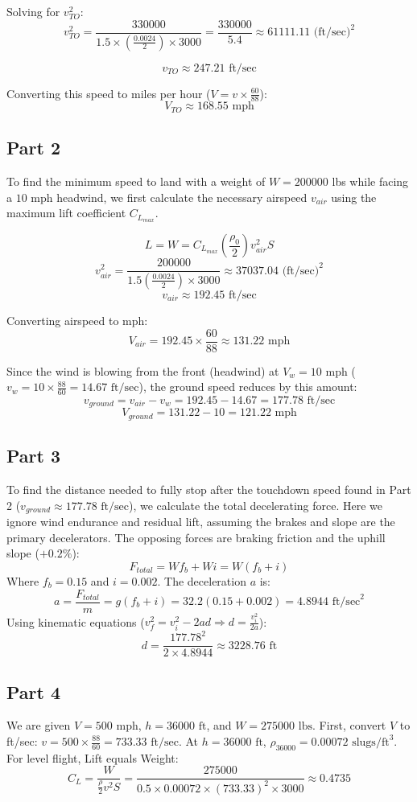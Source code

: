 \documentclass{KPS_assignment}
\begin{document}
Solving for $v_{TO}^2$:
$$ v_{TO}^2 = \frac{330000}{1.5 \times \left( \frac{0.0024}{2} \right) \times 3000} = \frac{330000}{5.4} \approx 61111.11 \text{ (ft/sec)}^2 $$

$$ v_{TO} \approx 247.21 \text{ ft/sec} $$

Converting this speed to miles per hour ($V = v \times \frac{60}{88}$):
$$ V_{TO} \approx 168.55 \text{ mph} $$

\subsection*{Part 2}
To find the minimum speed to land with a weight of $W = 200000$ lbs while facing a $10 \text{ mph}$ headwind, we first calculate the necessary airspeed $v_{air}$ using the maximum lift coefficient $C_{L_{max}}$.

$$ L = W = C_{L_{max}} \left( \frac{\rho_0}{2} \right) v_{air}^2 S $$
$$ v_{air}^2 = \frac{200000}{1.5 \left( \frac{0.0024}{2} \right) \times 3000} \approx 37037.04 \text{ (ft/sec)}^2 $$
$$ v_{air} \approx 192.45 \text{ ft/sec} $$

Converting airspeed to mph:
$$ V_{air} = 192.45 \times \frac{60}{88} \approx 131.22 \text{ mph} $$

Since the wind is blowing from the front (headwind) at $V_w = 10 \text{ mph}$ ($v_w = 10 \times \frac{88}{60} = 14.67 \text{ ft/sec}$), the ground speed reduces by this amount:
$$ v_{ground} = v_{air} - v_w = 192.45 - 14.67 = 177.78 \text{ ft/sec} $$
$$ V_{ground} = 131.22 - 10 = 121.22 \text{ mph} $$

\subsection*{Part 3}
To find the distance needed to fully stop after the touchdown speed found in Part 2 ($v_{ground} \approx 177.78 \text{ ft/sec}$), we calculate the total decelerating force. Here we ignore wind endurance and residual lift, assuming the brakes and slope are the primary decelerators.
The opposing forces are braking friction and the uphill slope ($+0.2\%$):
$$ F_{total} = W f_b + W i = W(f_b + i) $$
Where $f_b = 0.15$ and $i = 0.002$. The deceleration $a$ is:
$$ a = \frac{F_{total}}{m} = g(f_b + i) = 32.2 (0.15 + 0.002) = 4.8944 \text{ ft/sec}^2 $$
Using kinematic equations ($v_f^2 = v_i^2 - 2ad \Rightarrow d = \frac{v_i^2}{2a}$):
$$ d = \frac{177.78^2}{2 \times 4.8944} \approx 3228.76 \text{ ft} $$

\subsection*{Part 4}
We are given $V = 500 \text{ mph}$, $h = 36000 \text{ ft}$, and $W = 275000 \text{ lbs}$.
First, convert $V$ to ft/sec: $v = 500 \times \frac{88}{60} = 733.33 \text{ ft/sec}$.
At $h = 36000 \text{ ft}$, $\rho_{36000} = 0.00072 \text{ slugs/ft}^3$.
For level flight, Lift equals Weight:
$$ C_L = \frac{W}{ \frac{\rho}{2} v^2 S } = \frac{275000}{0.5 \times 0.00072 \times (733.33)^2 \times 3000} \approx 0.4735 $$
\end{document}
